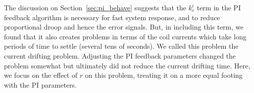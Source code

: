 
The discussion on Section~\ref{sec:pi_behave} suggests that the
$k_c^i$ term in the PI feedback algorithm is necessary for fast system
response, and to reduce proportional droop and hence the error
signals.  But, in including this term, we found that it also creates
problems in terms of the coil currents which take long periods of time
to settle (several tens of seconds).  We called this problem the
current drifting problem.  Adjusting the PI feedback parameters
changed the problem somewhat but ultimately did not reduce the current
drifting time.  Here, we focus on the effect of $r$ on this problem,
treating it on a more equal footing with the PI parameters.



